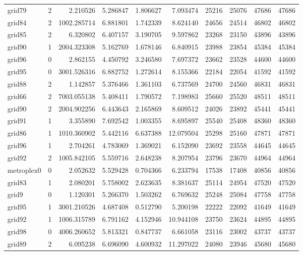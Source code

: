 \begin{longtable}{|l|r|r|r|r|r|r|r|r|r|}
grid79 & 2 & 2.210526 & 5.286847 & 1.806627 & 7.093474 & 25216 & 25076 & 47686 & 47686 \\
grid84 & 2 & 1002.285714 & 6.881801 & 1.742339 & 8.624140 & 24656 & 24514 & 46802 & 46802 \\
grid85 & 2 & 6.320802 & 6.407157 & 3.190705 & 9.597862 & 23268 & 23150 & 43896 & 43896 \\
grid90 & 1 & 2004.323308 & 5.162769 & 1.678146 & 6.840915 & 23988 & 23854 & 45384 & 45384 \\
grid96 & 0 & 2.862155 & 4.450792 & 3.246580 & 7.697372 & 23662 & 23528 & 44600 & 44600 \\
grid95 & 0 & 3001.526316 & 6.882752 & 1.272614 & 8.155366 & 22184 & 22054 & 41592 & 41592 \\
grid88 & 2 & 1.142857 & 5.376466 & 1.361103 & 6.737569 & 24700 & 24560 & 46831 & 46831 \\
grid66 & 2 & 7003.055138 & 5.408411 & 1.790572 & 7.198983 & 25660 & 25520 & 48511 & 48511 \\
grid90 & 2 & 2004.902256 & 6.443643 & 2.165869 & 8.609512 & 24026 & 23892 & 45441 & 45441 \\
grid91 & 1 & 3.355890 & 7.692542 & 1.003355 & 8.695897 & 25540 & 25408 & 48360 & 48360 \\
grid86 & 1 & 1010.360902 & 5.442116 & 6.637388 & 12.079504 & 25298 & 25160 & 47871 & 47871 \\
grid96 & 1 & 2.704261 & 4.783069 & 1.369021 & 6.152090 & 23692 & 23558 & 44645 & 44645 \\
grid92 & 2 & 1005.842105 & 5.559716 & 2.648238 & 8.207954 & 23796 & 23670 & 44964 & 44964 \\
metroplex0 & 0 & 2.052632 & 5.529428 & 0.704366 & 6.233794 & 17538 & 17408 & 40856 & 40856 \\
grid83 & 1 & 2.080201 & 5.758002 & 2.623635 & 8.381637 & 25114 & 24954 & 47520 & 47520 \\
grid9 & 0 & 1.120301 & 5.266370 & 1.503262 & 6.769632 & 25248 & 25084 & 47758 & 47758 \\
grid95 & 1 & 3001.210526 & 4.687408 & 0.512790 & 5.200198 & 22222 & 22092 & 41649 & 41649 \\
grid92 & 1 & 1006.315789 & 6.791162 & 4.152946 & 10.944108 & 23750 & 23624 & 44895 & 44895 \\
grid98 & 0 & 4006.260652 & 5.813321 & 0.847737 & 6.661058 & 23116 & 23002 & 43737 & 43737 \\
grid89 & 2 & 6.095238 & 6.696090 & 4.600932 & 11.297022 & 24080 & 23946 & 45680 & 45680 \\

\end{longtable}
